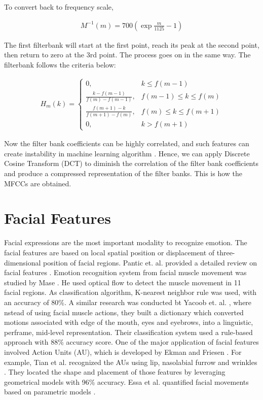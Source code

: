 To convert back to frequency scale, 

\begin{align}
    M^{-1}(m) = 700(\exp{\frac{m}{1125}} -1)
\end{align}

The first filterbank will start at the first point, reach its peak at the second point, then return to zero at the 3rd point. The process goes on in the same way. The filterbank follows the criteria below:


\begin{align}

H_m (k) = \begin{cases} 
0, &  k \le f(m-1) \\ \frac{k-f(m-1)}{f(m)-f(m-1)}, & f(m-1)\leq k \leq f(m)\\\frac{f(m+1)-k}{f(m+1)-f(m)}, & f(m) \leq k \leq f(m+1)\\ 0, & k > f(m+1)
\end{cases}
\end{align}

Now the filter bank coefficients can be highly correlated, and such features can create instability in machine learning algorithm . Hence, we can apply Discrete Cosine Transform (DCT) to diminish the correlation of the filter bank coefficients and produce a compressed representation of the filter banks. This is how the MFCCs are obtained. 

\section{Facial Features}

Facial expressions are the most important modality to recognize emotion. The facial features are based on local spatial position or displacement of three-dimensional position of facial regions. Pantic et. al. provided a detailed review on facial features \cite{19}. Emotion recognition system from facial muscle movement was studied by Mase \cite{16}.  He used optical flow to detect the muscle movement in 11 facial regions. As classification algorithm, K-nearest neighbor rule was used, with an accuracy of 80\%. A similar research was conducted bt  Yacoob et. al. \cite{22}, where nstead of using facial muscle actions, they built a dictionary which converted motions associated with edge of the mouth, eyes and eyebrows, into a linguistic, perframe, mid-level representation. Their classification system used a rule-based approach with 88\% accuracy score. One of the major application of facial features involved Action Units (AU),  which is developed by Ekman and Friesen \cite{10}. For example, Tian et al. recognized the AUs using lip, nasolabial furrow and wrinkles \cite{21} . They located the shape and placement of those features by leveraging geometrical models with 96\% accuracy. Essa et al. quantified facial movements based on parametric models \cite{11}.


